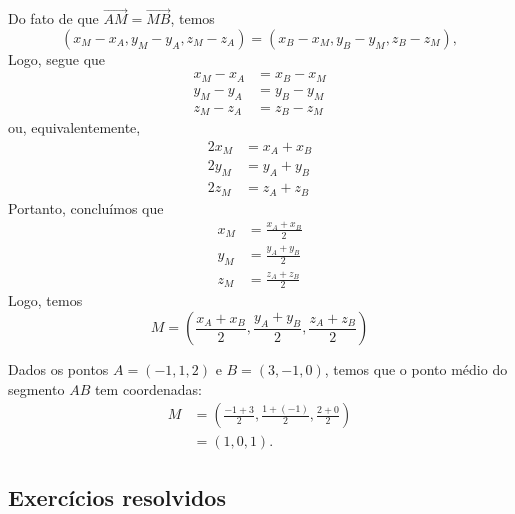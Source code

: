 Do fato de que $\overrightarrow{AM} = \overrightarrow{MB}$, temos
\begin{equation}
  (x_M-x_A,y_M-y_A,z_M-z_A)=(x_B-x_M,y_B-y_M,z_B-z_M),
\end{equation}
Logo, segue que
\begin{align}
  x_M-x_A &= x_B-x_M\\
  y_M-y_A &= y_B-y_M\\
  z_M-z_A &= z_B-z_M
\end{align}
ou, equivalentemente,
\begin{align}
  2x_M &= x_A+x_B\\
  2y_M &= y_A+y_B\\
  2z_M &= z_A+z_B
\end{align}
Portanto, concluímos que
\begin{align}
  x_M &= \frac{x_A+x_B}{2}\\
  y_M &= \frac{y_A+y_B}{2}\\
  z_M &= \frac{z_A+z_B}{2}
\end{align}  
Logo, temos
\begin{equation}
M = \left(\frac{x_A+x_B}{2},\frac{y_A+y_B}{2},\frac{z_A+z_B}{2}\right)
\end{equation}

\begin{ex}
  Dados os pontos $A = (-1,1,2)$ e $B = (3,-1,0)$, temos que o ponto médio do segmento $AB$ tem coordenadas:
  \begin{align}
    M &= \left(\frac{-1+3}{2},\frac{1+(-1)}{2},\frac{2+0}{2}\right)\\
    &= (1,0,1).
  \end{align}
\end{ex}

\subsection*{Exercícios resolvidos}

